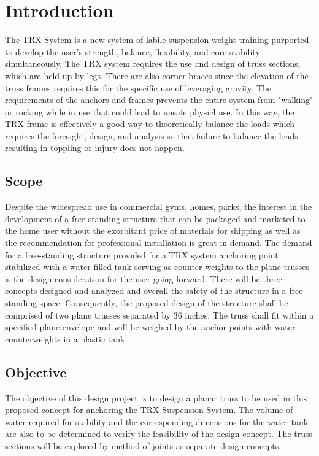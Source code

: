 \chapter{Introduction}
The TRX System is a new system of labile suspension weight training purported to develop the user's strength, balance, flexibility, and core stability simultaneously. The TRX system requires the use and design of truss sections, which are held up by legs. There are also corner braces since the elevation of the truss frames requires this for the specific use of leveraging gravity. The requirements of the anchors and frames prevents the entire system from "walking" or rocking while in use that could lead to unsafe physicl use. In this way, the TRX frame is effectively a good way to theoretically balance the loads which requires the foresight, design, and analysis so that failure to balance the loads resulting in toppling or injury does not happen.
\section{Scope}
Despite the widespread use in commercial gyms, homes, parks, the interest in the development of a free-standing structure that can be packaged and marketed to the home user without the exorbitant price of materials for shipping as well as the recommendation for professional installation is great in demand. The demand for a free-standing structure provided for a TRX system anchoring point stabilized with a water filled tank serving as counter weights to the plane trusses is the design consideration for the user going forward. There will be three concepts designed and analyzed and overall the safety of the structure in a free-standing space. Consequently, the proposed design of the structure shall be comprised of two plane trusses separated by 36 inches. The truss shall fit within a specified plane envelope and will be weighed by the anchor points with water counterweights in a plastic tank.\\ 
\section{Objective}
The objective of this design project is to design a planar truss to be used in this proposed concept for anchoring the TRX Suspension System. The volume of water required for stability and the corresponding dimensions for the water tank are also to be determined to verify the feasibility of the design concept. The truss sections will be explored by method of joints as separate design concepts. \\
